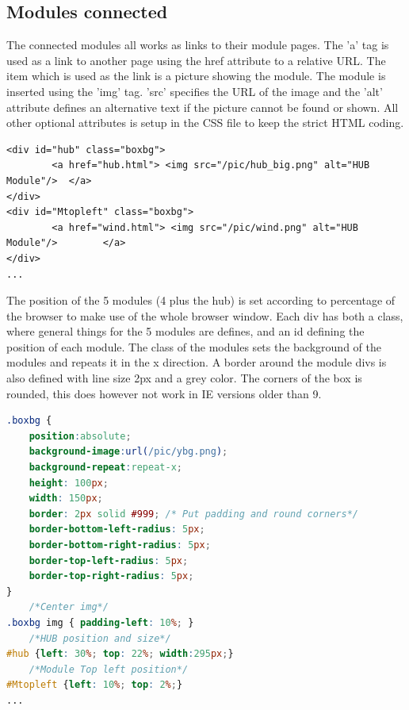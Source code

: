 \subsection{Modules connected}
The connected modules all works as links to their module pages. The 'a' tag is used as a link to another page using the href attribute to a relative URL. The item which is used as the link is a picture showing the module. The module is inserted using the 'img' tag. 'src' specifies the URL of the image and the 'alt' attribute defines an alternative text if the picture cannot be found or shown. All other optional attributes is setup in the CSS file to keep the strict HTML coding.
\begin{lstlisting}
<div id="hub" class="boxbg">
		<a href="hub.html"> <img src="/pic/hub_big.png" alt="HUB Module"/> 	</a>
</div>
<div id="Mtopleft" class="boxbg">
		<a href="wind.html"> <img src="/pic/wind.png" alt="HUB Module"/> 		</a>
</div>
...
\end{lstlisting}
The position of the 5 modules (4 plus the hub) is set according to percentage of the browser to make use of the whole browser window. Each div has both a class, where general things for the 5 modules are defines, and an id defining the position of each module. The class of the modules sets the background of the modules and repeats it in the x direction. A border around the module divs is also defined with line size 2px and a grey color. The corners of the box is rounded, this does however not work in IE versions older than 9.
\begin{lstlisting}[language=CSS]
.boxbg {
	position:absolute;
	background-image:url(/pic/ybg.png);
	background-repeat:repeat-x;
	height: 100px;
	width: 150px;
	border: 2px solid #999;	/* Put padding and round corners*/
	border-bottom-left-radius: 5px;
	border-bottom-right-radius: 5px;
	border-top-left-radius: 5px;
	border-top-right-radius: 5px;
}
	/*Center img*/
.boxbg img { padding-left: 10%; }
	/*HUB position and size*/
#hub {left: 30%; top: 22%; width:295px;}
	/*Module Top left position*/
#Mtopleft {left: 10%; top: 2%;}
...
\end{lstlisting}

